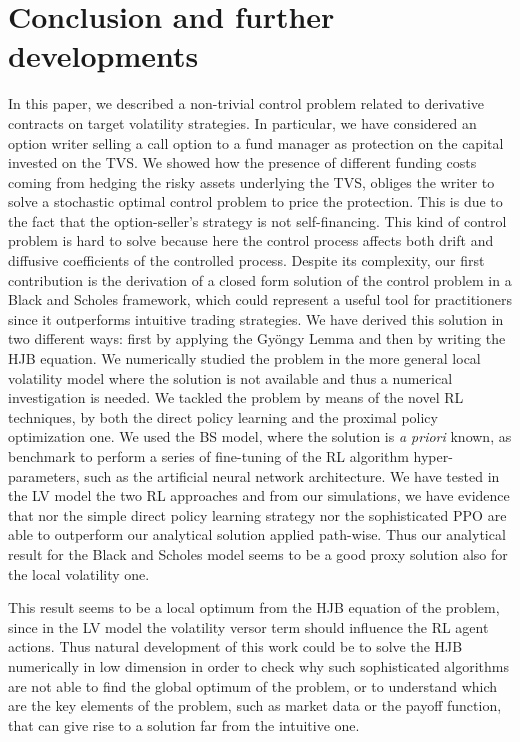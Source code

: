 \documentclass[runningheads]{m2ef}
\begin{document}
	\section{Conclusion and further developments}
	In this paper, we described a non-trivial control problem related to derivative contracts on target volatility strategies. In particular, we have considered an option writer selling a call option to a fund manager as protection on the capital invested on the TVS. We showed how the presence of different funding costs coming from hedging the risky assets underlying the TVS, obliges the writer to solve a stochastic optimal control problem to price the protection. This is due to the fact that the option-seller's strategy is not self-financing. This kind of control problem is hard to solve because here the control process affects both drift and diffusive coefficients of the controlled process. Despite its complexity, our first contribution is the derivation of a closed form solution of the control problem in a Black and Scholes framework, which could represent a useful tool for practitioners since it outperforms intuitive trading strategies. We have derived this solution in two different ways: first by applying the Gy\"ongy  Lemma and then by writing the HJB equation.  We numerically studied the problem in the more general local volatility model where the solution is not available and thus a numerical investigation is needed. We tackled the problem by means of the novel RL techniques, by both the direct policy learning and the proximal policy optimization one. We used the BS model, where the solution is \textit{a priori} known, as benchmark to perform a series of fine-tuning of the RL algorithm hyper-parameters, such as the artificial neural network architecture. We have tested in the LV model the two RL approaches and from our simulations, we have evidence that nor the simple direct policy learning strategy nor the sophisticated PPO are able to outperform our analytical solution applied path-wise. Thus our analytical result for the Black and Scholes model seems to be a good proxy solution also for the local volatility one.

	This result seems to be a local optimum from the HJB equation of the problem, since in the LV model the volatility versor term should influence the RL agent actions. Thus natural development of this work could be to solve the HJB numerically in low dimension in order to check why such sophisticated algorithms are not able to find the global optimum of the problem, or to understand which are the key elements of the problem, such as market data or the payoff function, that can give rise to a solution far from the intuitive one. 
\end{document}
